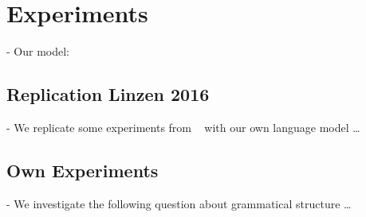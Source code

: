 \section{Experiments}
\label{experiments}

- Our model:

\subsection{Replication Linzen 2016}
\label{replication}

- We replicate some experiments from ~\cite{Linzen2016} with our own language model \ldots

\subsection{Own Experiments}
\label{own-experiments}

- We investigate the following question about grammatical structure \ldots

